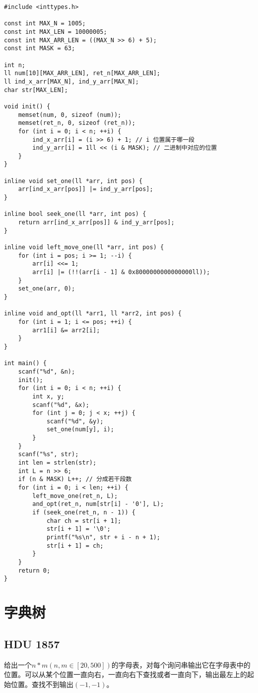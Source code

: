 \begin{lstlisting}
#include <inttypes.h>

const int MAX_N = 1005;
const int MAX_LEN = 10000005;
const int MAX_ARR_LEN = ((MAX_N >> 6) + 5);
const int MASK = 63;

int n;
ll num[10][MAX_ARR_LEN], ret_n[MAX_ARR_LEN];
ll ind_x_arr[MAX_N], ind_y_arr[MAX_N];
char str[MAX_LEN];

void init() {
	memset(num, 0, sizeof (num));
	memset(ret_n, 0, sizeof (ret_n));
	for (int i = 0; i < n; ++i) {
		ind_x_arr[i] = (i >> 6) + 1; // i 位置属于哪一段
		ind_y_arr[i] = 1ll << (i & MASK); // 二进制中对应的位置
	}
}

inline void set_one(ll *arr, int pos) {
	arr[ind_x_arr[pos]] |= ind_y_arr[pos];
}

inline bool seek_one(ll *arr, int pos) {
	return arr[ind_x_arr[pos]] & ind_y_arr[pos];
}

inline void left_move_one(ll *arr, int pos) {
	for (int i = pos; i >= 1; --i) {
		arr[i] <<= 1;
		arr[i] |= (!!(arr[i - 1] & 0x8000000000000000ll));
	}
	set_one(arr, 0);
}

inline void and_opt(ll *arr1, ll *arr2, int pos) {
	for (int i = 1; i <= pos; ++i) {
		arr1[i] &= arr2[i];
	}
}

int main() {
	scanf("%d", &n);
	init();
	for (int i = 0; i < n; ++i) {
		int x, y;
		scanf("%d", &x);
		for (int j = 0; j < x; ++j) {
			scanf("%d", &y);
			set_one(num[y], i);
		}
	}
	scanf("%s", str);
	int len = strlen(str);
	int L = n >> 6;
	if (n & MASK) L++; // 分成若干段数
	for (int i = 0; i < len; ++i) {
		left_move_one(ret_n, L);
		and_opt(ret_n, num[str[i] - '0'], L);
		if (seek_one(ret_n, n - 1)) {
			char ch = str[i + 1];
			str[i + 1] = '\0';
			printf("%s\n", str + i - n + 1);
			str[i + 1] = ch;
		}
	}
	return 0;
}
\end{lstlisting}

\clearpage
\section{字典树}
\subsection{HDU 1857}

给出一个$n*m(n,m\in [20,500])$的字母表，对每个询问串输出它在字母表中的位置。可以从某个位置一直向右，一直向右下查找或者一直向下，输出最左上的起始位置。查找不到输出$(-1,-1)$。

